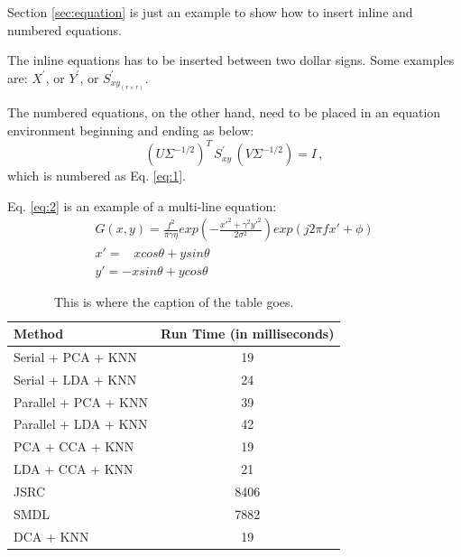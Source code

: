 Section \ref{sec:equation} is just an example to show how to insert inline and numbered equations. 

The inline equations has to be inserted between two dollar signs. Some examples are: $X^{\prime}$, or $Y^{\prime}$, or $S_{xy_{(r\times r)}}^{\prime}$. 

The numbered equations, on the other hand, need to be placed in an equation environment beginning and ending as below:
%
\begin{equation} \label{eq:1}
(U \Sigma^{-1/2})^T \, S_{xy}^{\prime} \, (V \Sigma^{-1/2}) = I \,,
\end{equation}
%
which is numbered as Eq. \ref{eq:1}.

Eq. \ref{eq:2} is an example of a multi-line equation:
\begin{equation} \begin{split} \label{eq:2}
G(x,y)=\frac{f^2}{\pi\gamma\eta} exp{\left(-\frac{x'^2+\gamma^2 y'^2}{2\sigma^2}\right)} exp{\left( j2\pi f x' + \phi \right)}     \\
x' = \;\;\; xcos\theta+ysin\theta    \\
y' = -xsin\theta+ycos\theta
\end{split} \end{equation}


\begin{table}[t]
\renewcommand{\arraystretch}{1.1}
\caption{This is where the caption of the table goes.}
\label{tab:runTime}
\centering
\footnotesize
\vspace{-0.1in}
\begin{tabular}{|l|c|}
\hline
Method				& 	Run Time (in milliseconds)\\
\hline\hline
Serial + PCA + KNN 		& 	19		\\
Serial + LDA + KNN 		& 	24		\\
Parallel + PCA + KNN 		& 	39		\\
Parallel + LDA + KNN 		& 	42		\\
PCA + CCA + KNN 		& 	19		\\
LDA + CCA + KNN 		& 	21		\\
JSRC 				& 	8406		\\
SMDL				&	7882		\\
DCA + KNN 			& 	19		\\
\hline
\end{tabular}
\vspace{-0.1in}
\end{table}




